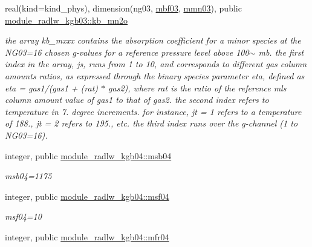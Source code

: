 \begin{DoxyCompactItemize}
\mbox{\label{group__module__radlw__kgbnn_gaa2442e663e83b222648a86a34cd6631c}} 
real(kind=kind\+\_\+phys), dimension(ng03, \hyperlink{group__module__radlw__kgbnn_ga655fff8711d78d62ae9d4fa27d02621a}{mbf03}, \hyperlink{group__module__radlw__kgbnn_gab4e84b10460930267256c0e5a1fe7a55}{mmn03}), public \hyperlink{group__module__radlw__kgbnn_gaa2442e663e83b222648a86a34cd6631c}{module\+\_\+radlw\+\_\+kgb03\+::kb\+\_\+mn2o}
\begin{DoxyCompactList}\small\item\em the array kb\+\_\+mxxx contains the absorption coefficient for a minor species at the N\+G03=16 chosen g-\/values for a reference pressure level above 100$\sim$ mb. the first index in the array, js, runs from 1 to 10, and corresponds to different gas column amounts ratios, as expressed through the binary species parameter eta, defined as eta = gas1/(gas1 + (rat) $\ast$ gas2), where rat is the ratio of the reference mls column amount value of gas1 to that of gas2. the second index refers to temperature in 7. degree increments. for instance, jt = 1 refers to a temperature of 188., jt = 2 refers to 195., etc. the third index runs over the g-\/channel (1 to N\+G03=16). \end{DoxyCompactList}\item 
\mbox{\label{group__module__radlw__kgbnn_gab9ce0111a156f7b80f2adaa9f3e84a32}} 
integer, public \hyperlink{group__module__radlw__kgbnn_gab9ce0111a156f7b80f2adaa9f3e84a32}{module\+\_\+radlw\+\_\+kgb04\+::msb04}
\begin{DoxyCompactList}\small\item\em msb04=1175 \end{DoxyCompactList}\item 
\mbox{\label{group__module__radlw__kgbnn_ga4b38dd1165aca80e19697df7ae74a27a}} 
integer, public \hyperlink{group__module__radlw__kgbnn_ga4b38dd1165aca80e19697df7ae74a27a}{module\+\_\+radlw\+\_\+kgb04\+::msf04}
\begin{DoxyCompactList}\small\item\em msf04=10 \end{DoxyCompactList}\item 
\mbox{\label{group__module__radlw__kgbnn_gab6ae25b4a793bf78ccd504685d639039}} 
integer, public \hyperlink{group__module__radlw__kgbnn_gab6ae25b4a793bf78ccd504685d639039}{module\+\_\+radlw\+\_\+kgb04\+::mfr04}

\end{DoxyCompactItemize}

